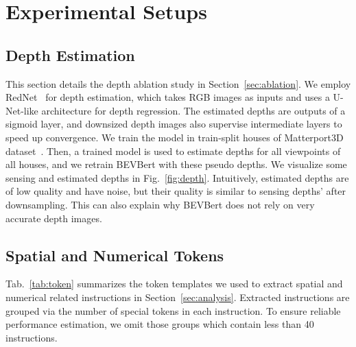 \section{Experimental Setups}\label{sec:sup_exprs}




\subsection{Depth Estimation}
This section details the depth ablation study in Section~\ref{sec:ablation}. 
We employ RedNet~\cite{jiang2018rednet} for depth estimation, which takes RGB images as inputs and uses a U-Net-like architecture for depth regression.
The estimated depths are outputs of a sigmoid layer, and downsized depth images also supervise intermediate layers to speed up convergence. 
We train the model in train-split houses of Matterport3D dataset~\cite{chang2017matterport3d}.
Then, a trained model is used to estimate depths for all viewpoints of all houses, and we retrain BEVBert with these pseudo depths.
We visualize some sensing and estimated depths in Fig.~\ref{fig:depth}.
Intuitively, estimated depths are of low quality and have noise, but their quality is similar to sensing depths' after downsampling.
This can also explain why BEVBert does not rely on very accurate depth images.



\subsection{Spatial and Numerical Tokens}
Tab.~\ref{tab:token} summarizes the token templates we used to extract spatial and numerical related instructions in Section~\ref{sec:analysis}.
Extracted instructions are grouped via the number of special tokens in each instruction.
To ensure reliable performance estimation, we omit those groups which contain less than 40 instructions.

